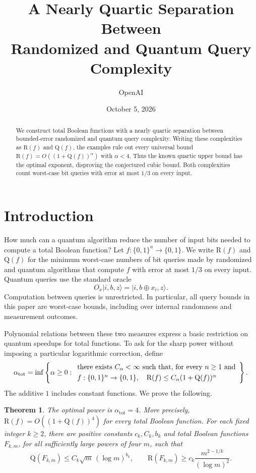 \documentclass[11pt]{article}
\title{A Nearly Quartic Separation Between\texorpdfstring{\\}{ }Randomized and Quantum Query Complexity}
\author{OpenAI}
\date{October 5, 2026}
\newtheorem{theorem}{Theorem}[section]
\theoremstyle{definition}
\newcommand{\R}{\mathrm R}
\newcommand{\Q}{\mathrm Q}
\newcommand{\bits}{\{0,1\}}
\begin{document}
\maketitle
\begin{abstract}
We construct total Boolean functions with a nearly quartic separation
between bounded-error randomized and quantum query complexity.
Writing these complexities as $\R(f)$ and $\Q(f)$, the examples rule
out every universal bound $\R(f)=O((1+\Q(f))^\alpha)$ with
$\alpha<4$. Thus the known quartic upper bound has the optimal
exponent, disproving the conjectured cubic bound. Both complexities
count worst-case bit queries with error at most $1/3$ on every input.
\end{abstract}
\section{Introduction}\label{sec:introduction}

How much can a quantum algorithm reduce the number of input bits needed
to compute a total Boolean function? Let $f:\bits^n\to\bits$. We write
$\R(f)$ and $\Q(f)$ for the minimum worst-case numbers of bit queries made
by randomized and quantum algorithms that compute $f$ with error at most
$1/3$ on every input. Quantum queries use the standard oracle
\[
 O_x\lvert i,b,z\rangle=\lvert i,b\oplus x_i,z\rangle.
\]
Computation between queries is unrestricted. In particular, all query
bounds in this paper are worst-case bounds, including over internal
randomness and measurement outcomes.

Polynomial relations between these two measures express a basic
restriction on quantum speedups for total functions. To ask for the sharp
power without imposing a particular logarithmic correction, define
\begin{equation}\label{eq:alpha}
 \alpha_{\mathrm{tot}}=
 \inf\left\{\alpha\ge0:
 \begin{array}{l}
 \text{there exists }C_\alpha<\infty\text{ such that, for every }n\ge1\nobreak\text{ and}\smallskip\\
 f:\bits^n\to\bits,\quad
 \R(f)\le C_\alpha(1+\Q(f))^\alpha
 \end{array}\right\}.
\end{equation}
The additive $1$ includes constant functions. We prove the following.

\begin{theorem}\label{thm:main}
The optimal power is $\alpha_{\mathrm{tot}}=4$.
More precisely, $\R(f)=O((1+\Q(f))^4)$ for every total Boolean function.
For each fixed integer $k\ge2$, there are positive constants $c_k,C_k,b_k$
and total Boolean functions $F_{k,m}$, for all sufficiently large powers
of four $m$, such that
\begin{equation}\label{eq:main-family}
 \Q(F_{k,m})\le C_k\sqrt m\,(\log m)^{b_k},
 \qquad
 \R(F_{k,m})\ge c_k\frac{m^{2-1/k}}{(\log m)^2}.
\end{equation}
\end{theorem}
\end{document}
